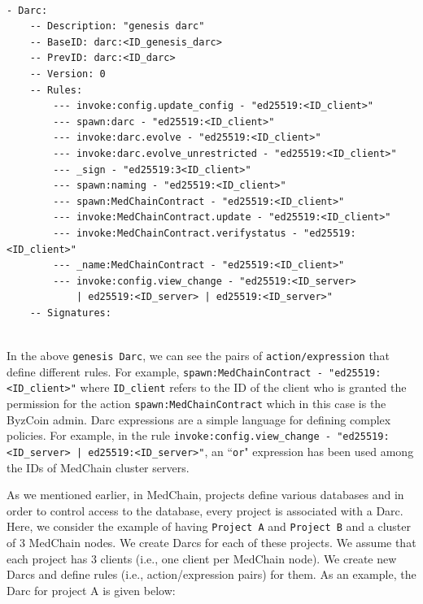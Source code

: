\begin{verbatim}

- Darc:
    -- Description: "genesis darc"
    -- BaseID: darc:<ID_genesis_darc>
    -- PrevID: darc:<ID_darc>
    -- Version: 0
    -- Rules:
        --- invoke:config.update_config - "ed25519:<ID_client>"
        --- spawn:darc - "ed25519:<ID_client>"
        --- invoke:darc.evolve - "ed25519:<ID_client>"
        --- invoke:darc.evolve_unrestricted - "ed25519:<ID_client>"
        --- _sign - "ed25519:3<ID_client>"
        --- spawn:naming - "ed25519:<ID_client>"
        --- spawn:MedChainContract - "ed25519:<ID_client>"
        --- invoke:MedChainContract.update - "ed25519:<ID_client>"
        --- invoke:MedChainContract.verifystatus - "ed25519:<ID_client>"
        --- _name:MedChainContract - "ed25519:<ID_client>"
        --- invoke:config.view_change - "ed25519:<ID_server> 
            | ed25519:<ID_server> | ed25519:<ID_server>"
    -- Signatures:
    
\end{verbatim}

In the above \texttt{genesis Darc}, we can see the pairs of \texttt{action/expression} that define different rules. For example, \texttt{spawn:MedChainContract - "ed25519:<ID\_client>"} where \texttt{ID\_client} refers to the ID of the client who is granted the permission for the action \texttt{spawn:MedChainContract} which in this case is the ByzCoin admin. Darc expressions are a simple language for defining complex policies. For example, in the rule \texttt{invoke:config.view\_change - "ed25519:<ID\_server> | ed25519:<ID\_server>"}, an ``\texttt{or}" expression has been used among the IDs of MedChain cluster servers. 

As we mentioned earlier, in MedChain, projects define various databases and in order to control access to the database, every project is associated with a Darc. Here, we consider the example of having \texttt{Project A} and \texttt{Project B} and a cluster of 3 MedChain nodes. We create Darcs for each of these projects. We assume that each project has 3 clients (i.e., one client per MedChain node). We create new Darcs and define rules (i.e., action/expression pairs) for them. As an example, the Darc for project A is given below:

